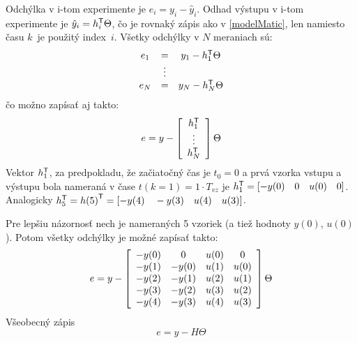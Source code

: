 \documentclass[a4paper, 10pt, ]{article}
\begin{document}
Odchýlka v i-tom experimente je $e_i = y_i - \hat{y}_i$. Odhad výstupu v i-tom experimente je $\hat{y}_i = h_i^{\mathsf{T}} \Theta$, čo je rovnaký zápis ako v \eqref{modelMatic}, len namiesto času $k$~je použitý index~$i$. Všetky odchýlky v $N$ meraniach sú:
\begin{equation}
	\begin{array}{*{4}c}
		e_1 & = &y_1 - h_1^\naT \Theta\\
		 & \vdots & \\
		e_N & = &y_N - h_N^\naT \Theta\\
	\end{array}
\end{equation}
čo možno zapísať aj takto:
\begin{equation}
	e = y -
	\left[{\begin{array}{*{20}c}
		h_1^\naT \\
		\vdots \\
		h_N^\naT
	\end{array}}\right]
	\Theta
\end{equation}
Vektor $ h_1^{\mathsf{T}}$, za predpokladu, že začiatočný čas je $t_0 = 0$ a prvá vzorka vstupu a výstupu bola nameraná v čase $t(k = 1) = 1\cdot T_{vz}$ je $ h_1^{\mathsf{T}} = \left[{ -y(0) \quad 0 \quad u(0) \quad 0 }\right]$. Analogicky $ h_5^{\mathsf{T}} = { h(5)}^{\mathsf{T}} =  \left[{ -y(4) \quad -y(3) \quad u(4) \quad u(3) }\right]$.

Pre lepšiu názornosť nech je nameraných 5 vzoriek (a tiež hodnoty $y(0)$, $u(0)$). Potom všetky odchýlky je možné zapísať takto:
\begin{equation}
	 e =  y -
		\left[{\begin{array}{*{20}c}
			-y(0) & 0 & u(0) & 0 \\
			-y(1) & -y(0) & u(1) & u(0) \\
			-y(2) & -y(1) & u(2) & u(1) \\
			-y(3) & -y(2) & u(3) & u(2) \\
			-y(4) & -y(3) & u(4) & u(3)
		\end{array}}\right]
		\Theta
\end{equation}
Všeobecný zápis
\begin{equation}
	 e = y - H \Theta
\end{equation}
\end{document}
